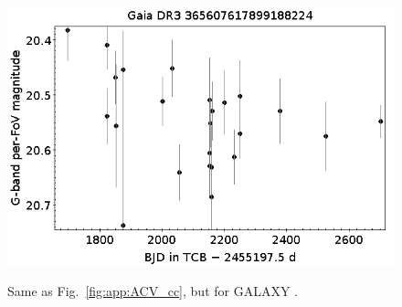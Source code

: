 \documentclass[longauth]{aa}
\def\gaia{\textit{Gaia}\xspace}
\begin{document}
\begin{appendix}
\begin{figure}
\hspace{2mm}
 \includegraphics[width=0.45\hsize]{figures/appendix/GALAXY-100.png} \\
\vspace{4mm}
 \caption{Same as Fig.~\ref{fig:app:ACV_cc}, but for GALAXY  \citep[light curves are limited to the subset with published photometric time series in the \gaia Andromeda Photometric Survey;][]{DR3-DPACP-142}.}
 \label{fig:app:GALAXY_ALL_cc}
\end{figure}


\end{appendix}
\end{document}
